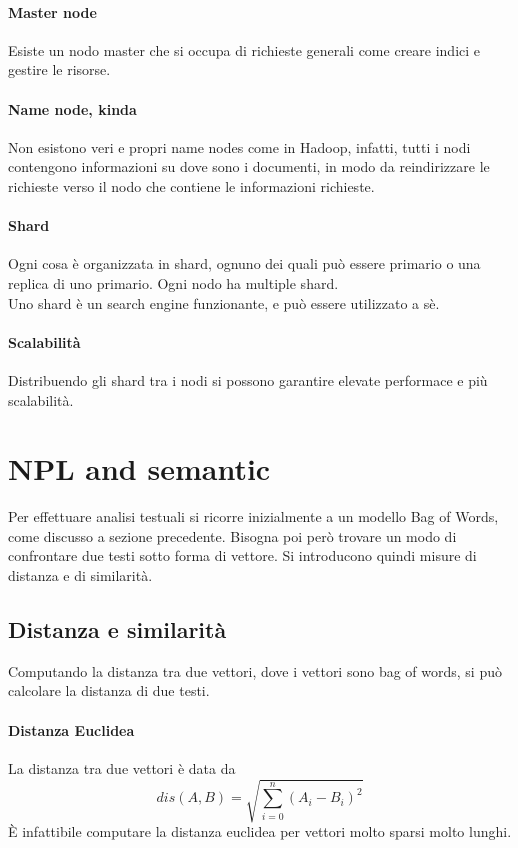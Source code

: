 \paragraph{Master node}
Esiste un nodo master che si occupa di richieste 
generali come creare indici e gestire le risorse.

\paragraph{Name node, kinda}
Non esistono veri e propri name nodes come in Hadoop, infatti, tutti i nodi contengono
informazioni su dove sono i documenti, in modo da reindirizzare le richieste verso 
il nodo che contiene le informazioni richieste.

\paragraph{Shard}
Ogni cosa è organizzata in shard, ognuno dei quali 
può essere primario o una replica di uno primario.
Ogni nodo ha multiple shard.\\
Uno shard è un search engine funzionante, e può essere utilizzato a sè.

\paragraph{Scalabilità}
Distribuendo gli shard tra i nodi si possono garantire elevate performace
e più scalabilità.

\section{NPL and semantic}
Per effettuare analisi testuali si ricorre inizialmente a un modello Bag of Words, 
come discusso a sezione precedente. Bisogna poi però trovare un modo di confrontare due 
testi sotto forma di vettore. Si introducono quindi misure di distanza e di similarità.

\subsection{Distanza e similarità}
Computando la distanza tra due vettori, dove i vettori sono bag of words, si può 
calcolare la distanza di due testi.

\paragraph{Distanza Euclidea}
La distanza tra due vettori è data da
$$
    dis(A, B) = \sqrt{\sum_{i=0}^{n} (A_i - B_i)^2}
$$
È infattibile computare la distanza euclidea per vettori molto sparsi molto lunghi.

